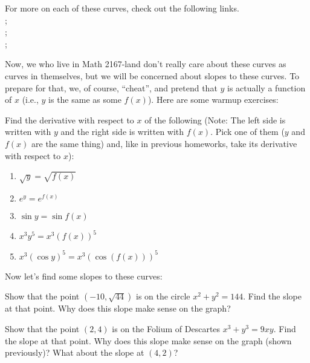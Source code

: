 \documentclass{ximera}
\begin{document}
For more on each of these curves, check out the following links.\\ 
;\\ ; \\
;\\ 

Now, we who live in Math 2167-land don't really care about these curves as curves in themselves, but we will be concerned about slopes to these curves.  To prepare for that, we, of course, ``cheat'', and pretend that $y$ is actually a function of $x$ (i.e., $y$ is the same as some $f(x)$).  Here are some warmup exercises:

\begin{exercise} 
Find the derivative with respect to $x$ of the following (Note: The left side is written with $y$ and the right side is written with $f(x)$.  Pick one of them ($y$ and $f(x)$ are the same thing) and, like in previous homeworks, take its derivative with respect to $x$):
\begin{enumerate}
    \item $\sqrt{y} = \sqrt{f(x)}$
    \item $e^y = e^{f(x)}$
    \item $\sin y = \sin f(x)$
    \item $x^3y^5 = x^3(f(x))^5$
    \item $x^3 (\cos y)^5 = x^3(\cos (f(x)))^5$
\end{enumerate}
\end{exercise}
        Now let's find some slopes to these curves:
\begin{exercise} 
Show that the point $(-10,  \sqrt{44})$ is on the circle  $x^2 + y^2 = 144$.  Find the slope at that point.  Why does this slope make sense on the graph?
\end{exercise}
\begin{exercise} 
Show that the point $(2, 4)$ is on the Folium of Descartes  $x^3+y^3=9xy$.  Find the slope at that point.  Why does this slope make sense on the graph (shown previously)?  What about the slope at $(4,2)$?
\end{exercise}
\end{document}
